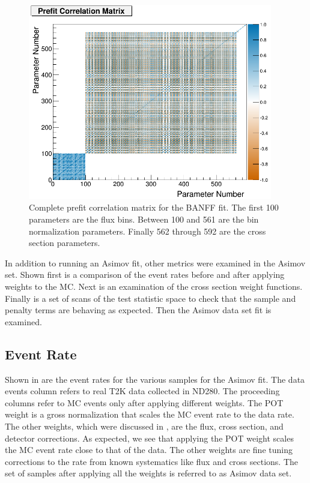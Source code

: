 \begin{figure}
\begin{centering}
\includegraphics[width=0.95\textwidth]{Chapters/Figures/Validation/Asimov/corr_pref}
\par\end{centering}
\caption[Complete Prefit Correlation Matrix for the BANFF Fit.]{Complete prefit correlation matrix for the BANFF fit. The first 100
parameters are the flux bins. Between 100 and 561 are the bin normalization
parameters. Finally 562 through 592 are the cross section parameters.
\label{fig:Complete-prefit-correlation}}

\end{figure}

In addition to running an Asimov fit, other metrics were examined
in the Asimov set. Shown first is a comparison of the event rates
before and after applying weights to the MC. Next is an examination
of the cross section weight functions. Finally is a set of scans of
the test statistic space to check that the sample and penalty terms
are behaving as expected. Then the Asimov data set fit is examined.


\subsection{Event Rate}

Shown in  are the event rates for the various
samples for the Asimov fit. The data events column refers to real
T2K data collected in ND280. The proceeding columns refer to MC events
only after applying different weights. The POT weight is a gross normalization
that scales the MC event rate to the data rate. The other weights,
which were discussed in , are the
flux, cross section, and detector corrections. As expected, we see
that applying the POT weight scales the MC event rate close to that
of the data. The other weights are fine tuning corrections to the
rate from known systematics like flux and cross sections. The set
of samples after applying all the weights is referred to as Asimov
data set.

